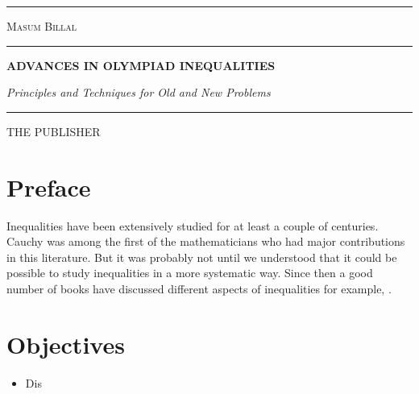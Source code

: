 \documentclass[a4paper, 12pt, leqno, twoside]{book}
\newlength{\drop}
\newlength{\tpheight}\setlength{\tpheight}{0.9\textheight}
\newlength{\txtheight}\setlength{\txtheight}{0.9\tpheight}
\newlength{\tpwidth}\setlength{\tpwidth}{0.9\textwidth}
\newlength{\txtwidth}\setlength{\txtwidth}{0.9\tpwidth}
\theoremstyle{definition}
\numberwithin{problem}{chapter}
\begin{document}
	\frontmatter
	\begin{titlepage}
		\txtheight
		\begin{minipage}[t]{0.05\txtwidth}
			\color{black}
			\rule{6pt}{\txtheight}
		\end{minipage}
		\hspace{0.05\txtwidth}
		\begin{minipage}[t]{2\txtwidth}
			\vspace*{\drop}
			{\Large {\scshape Masum Billal} %
			} 
			\\
			\rule{1\txtwidth}{1pt} \par
			\vspace{3\baselineskip}
			{\noindent\bfseries ADVANCES IN OLYMPIAD INEQUALITIES} \par
			\vspace{2\baselineskip}
			{\large\itshape Principles and Techniques for Old and New Problems} \par
			\vspace{6.5\baselineskip}
			{\scshape } \par
			\vspace{0.1\baselineskip}
			{\Large } \par
			\vspace{\baselineskip}
			\rule{\txtwidth}{1pt} \par
			\vspace{\baselineskip}
			{\Large THE PUBLISHER}
		\end{minipage}
		\hfill
	\end{titlepage}

	\begin{refsection}
		\section*{Preface}

		Inequalities have been extensively studied for at least a couple of centuries. Cauchy was among the first of the mathematicians who had major contributions in this literature. But it was probably not until \textcite{hardy_littlewood_polya_1934} we understood that it could be possible to study inequalities in a more systematic way. Since then a good number of books have discussed different aspects of inequalities for example, \textcite{beckenbach_bellman_1983}.

		\section*{Objectives}
			\begin{itemize}
				\item Dis
			\end{itemize}
		\printbibliography
	\end{refsection}
	\tableofcontents
	\mainmatter
\end{document}
